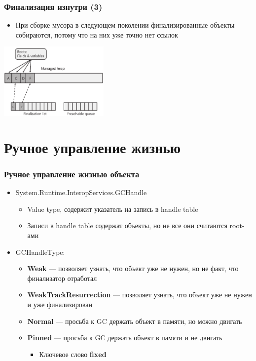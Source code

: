 \documentclass{../../slides-style}
\begin{document}
    \begin{frame}
        \frametitle{Финализация изнутри (3)}
        \begin{itemize}
            \item При сборке мусора в следующем поколении финализированные объекты собираются, потому что на них уже точно нет ссылок
        \end{itemize}
        \begin{center}
            \includegraphics[width=0.4\textwidth]{finalizationDone.png}
        \end{center}
    \end{frame}

    \section{Ручное управление жизнью}

    \begin{frame}
        \frametitle{Ручное управление жизнью объекта}
        \begin{itemize}
            \item System.Runtime.InteropServices.GCHandle
            \begin{itemize}
                \item Value type, содержит указатель на запись в handle table
                \item Записи в handle table содержат объекты, но не все они считаются root-ами
            \end{itemize}
            \item GCHandleType:
            \begin{itemize}
                \item \textbf{Weak} --- позволяет узнать, что объект уже не нужен, но не факт, что финализатор отработал
                \item \textbf{WeakTrackResurrection} --- позволяет узнать, что объект уже не нужен и уже финализирован
                \item \textbf{Normal} --- просьба к GC держать объект в памяти, но можно двигать
                \item \textbf{Pinned} --- просьба к GC держать объект в памяти и не двигать
                \begin{itemize}
                    \item Ключевое слово \textbf{fixed}
                \end{itemize}
            \end{itemize}
        \end{itemize}
    \end{frame}
\end{document}
